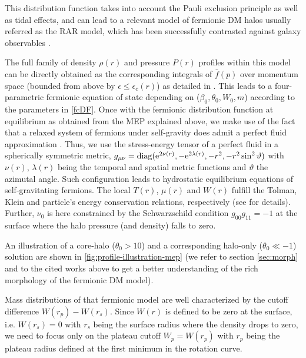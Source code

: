 This distribution function takes into account the Pauli exclusion principle as well as tidal effects, and can lead to a relevant model of fermionic DM halos usually referred as the RAR model, which has been successfully contrasted against galaxy observables \citep{2018PDU....21...82A,2019PDU....24..278A,2020A&A...641A..34B,2021MNRAS.505L..64B,2022MNRAS.511L..35A}.

The full family of density $\rho(r)$ and pressure $P(r)$ profiles within this model can be directly obtained as the corresponding integrals of $\bar{f}(p)$ over momentum space (bounded from above by $\epsilon \leq \epsilon_c(r)$) as detailed in \citet{2018PDU....21...82A}. This leads to a four-parametric fermionic equation of state depending on ($\beta_0,\theta_0,W_0,m$) according to the parameters in \cref{fcDF}. Once with the fermionic distribution function at equilibrium as obtained from the MEP explained above, we make use of the fact that a relaxed system of fermions under self-gravity does admit a perfect fluid approximation \citep{1969PhRv..187.1767R}. Thus, we use the stress-energy tensor of a perfect fluid in a spherically symmetric metric, $g_{\mu\nu}=\operatorname{diag}(\mathrm{e}^{2\nu(r)},-\mathrm{e}^{2\lambda(r)},-r^2,-r^2\sin^2\vartheta)$ with $\nu(r)$, $\lambda(r)$ being the temporal and spatial metric functions and $\vartheta$ the azimutal angle. Such configuration leads to hydrostatic equilibrium equations of self-gravitating fermions. The local $T(r)$, $\mu(r)$ and $W(r)$ fulfill the Tolman, Klein and particle's energy conservation relations, respectively (see \citealp{2018PDU....21...82A} for details). Further, $\nu_0$ is here constrained by the Schwarzschild condition $g_{00}g_{11} = -1$ at the surface where the halo pressure (and density) falls to zero.

An illustration of a core-halo ($\theta_0 > 10$) and a corresponding halo-only ($\theta_0 \ll -1$) solution are shown in \cref{fig:profile-illustration-mep} (we refer to section \ref{sec:morph} and to the cited works above to get a better understanding of the rich morphology of the fermionic DM model).


Mass distributions of that fermionic model are well characterized by the cutoff difference $W(r_p) - W(r_s)$. Since $W(r)$ is defined to be zero at the surface, i.e. $W(r_s) = 0$ with $r_s$ being the surface radius where the density drops to zero, we need to focus only on the plateau cutoff $W_p = W(r_p)$ with $r_p$ being the plateau radius defined at the first minimum in the rotation curve. 

